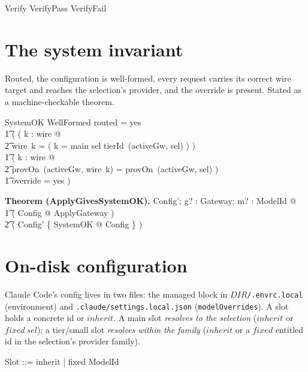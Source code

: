 \documentclass{article}
\makeatletter
\newenvironment{theorem}[1]{\medskip\noindent\textbf{Theorem (#1).}\@nameuse{zed}}{\@nameuse{endzed}}
\makeatother
\begin{document}
\begin{zed}
  Verify  VerifyPass \lor VerifyFail
\end{zed}

\section{The system invariant}

Routed, the configuration is well-formed, every request carries its correct wire
target and reaches the selection's provider, and the override is present. Stated
as a machine-checkable theorem.

\begin{schema}{SystemOK}
  WellFormed
\where
  routed = yes \implies \\
  \t1 ( ( \forall k : \dom wire @ \\
  \t2     wire~k = ( \IF k = main \THEN sel \ELSE tierId~(activeGw, sel) ) ) \land \\
  \t1   ( \forall k : \dom wire @ \\
  \t2     provOn~(activeGw, wire~k) = provOn~(activeGw, sel) ) \land \\
  \t1   override = yes )
\end{schema}

\begin{theorem}{ApplyGivesSystemOK}
  \forall Config'; g? : Gateway; m? : ModelId @ \\
  \t1 ( \exists Config @ ApplyGateway ) \implies \\
  \t2 ( \theta Config' \in \{ SystemOK @ \theta Config \} )
\end{theorem}

\section{On-disk configuration}

Claude Code's config lives in two files: the managed block in
$DIR$\texttt{/.envrc.local} (environment) and \texttt{.claude/settings.local.json}
(\texttt{modelOverrides}). A slot holds a concrete id or $inherit$. A main slot
\emph{resolves to the selection} ($inherit$ or $fixed~sel$); a tier/small slot
\emph{resolves within the family} ($inherit$ or a $fixed$ entitled id in the
selection's provider family).

\begin{zed}
  Slot ::= inherit | fixed \ldata ModelId \rdata
\end{zed}
\end{document}
